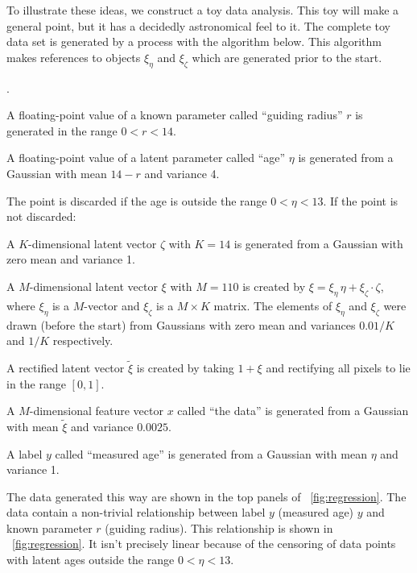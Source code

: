 \documentclass[11pt]{article}
\newenvironment{hoggnumerate}
  {\begin{list}
    {\arabic{enumii}.}
    {\usecounter{enumii}
     \setlength{\itemsep}{0in}
     \setlength{\parsep}{0in}
     \setlength{\parskip}{0in}
    }
  }
{\end{list}}
\begin{document}
To illustrate these ideas, we construct a toy data analysis.
This toy will make a general point, but it has a decidedly astronomical feel to it.
The complete toy data set is generated by a process with the algorithm below.
This algorithm makes references to objects $\xi_\eta$ and $\xi_\zeta$ which are generated prior to the start.
\begin{hoggnumerate}
    \item A floating-point value of a known parameter called ``guiding radius'' $r$ is generated in the range $0<r<14$.
    \item A floating-point value of a latent parameter called ``age'' $\eta$ is generated from a Gaussian with mean $14 - r$ and variance 4.
    \item The point is discarded if the age is outside the range $0<\eta<13$. If the point is not discarded:
    \item A $K$-dimensional latent vector $\zeta$ with $K=14$ is generated from a Gaussian with zero mean and variance 1.
    \item A $M$-dimensional latent vector $\xi$ with $M=110$ is created by $\xi = \xi_\eta\,\eta + \xi_\zeta\cdot\zeta$, where $\xi_\eta$ is a $M$-vector and $\xi_\zeta$ is a $M\times K$ matrix.
    The elements of $\xi_\eta$ and $\xi_\zeta$ were drawn (before the start) from Gaussians with zero mean and variances $0.01/K$ and $1/K$ respectively.
    \item A rectified latent vector $\tilde{\xi}$ is created by taking $1 + \xi$ and rectifying all pixels to lie in the range $[0, 1]$.
    \item A $M$-dimensional feature vector $x$ called ``the data'' is generated from a Gaussian with mean $\tilde{\xi}$ and variance $0.0025$.
    \item A label $y$ called ``measured age'' is generated from a Gaussian with mean $\eta$ and variance 1.
\end{hoggnumerate}
The data generated this way are shown in the top panels of \figurename~\ref{fig:regression}.
The data contain a non-trivial relationship between label $y$ (measured age) $y$ and known parameter $r$ (guiding radius).
This relationship is shown in \figurename~\ref{fig:regression}.
It isn't precisely linear because of the censoring of data points with latent ages outside the range $0<\eta<13$.
\end{document}
